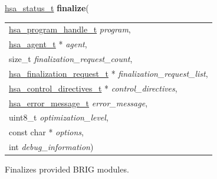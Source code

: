 \documentclass[final]{book}
\newcommand{\hsaarg}[1]{\textit{#1}}
\begin{document}
\begin{appendices}
\noindent\begin{tcolorbox}[breakable,nobeforeafter,colframe=white,colback=lightgray,left=0mm]
\hyperlink{group--status-1gad755322e7ff95456520e8abdbe90d225}{hsa_status_t} \hypertarget{group--HsailLinkerServiceLayer-1ga890b21eb14a9d6d65498166c7b79941c}{\textbf{finalize}}(
\vspace{-3.5mm}\begin{longtable}{@{}p{\textwidth}}
\hspace{1.7em}\hyperlink{group--HsailLinkerServiceLayer-1ga7b28ca39da981be49aac99608eb386cb}{hsa_program_handle_t} \hsaarg{program},\\
\hspace{1.7em}\hyperlink{group--topology-1gab8db3fb886332a24acac08ec361e1d86}{hsa_agent_t} * \hsaarg{agent},\\
\hspace{1.7em}size_t \hsaarg{finalization_request_count},\\
\hspace{1.7em}\hyperlink{group--FinalizerCoreApi-1gaf933a0a1175b6a9930f45a7d62e76fdb}{hsa_finalization_request_t} * \hsaarg{finalization_request_list},\\
\hspace{1.7em}\hyperlink{group--FinalizerCoreApi-1ga40030e03c0503b0f2c704f6cf6002add}{hsa_control_directives_t} * \hsaarg{control_directives},\\
\hspace{1.7em}\hyperlink{group--FinalizerCoreApi-1ga0105dcb4254850e0ec03d44fc54e11b8}{hsa_error_message_t} \hsaarg{error_message},\\
\hspace{1.7em}uint8_t \hsaarg{optimization_level},\\
\hspace{1.7em}const char * \hsaarg{options},\\
\hspace{1.7em}int \hsaarg{debug_information})\end{longtable}

\end{tcolorbox}
Finalizes provided BRIG modules.


\end{appendices}
\end{document}
